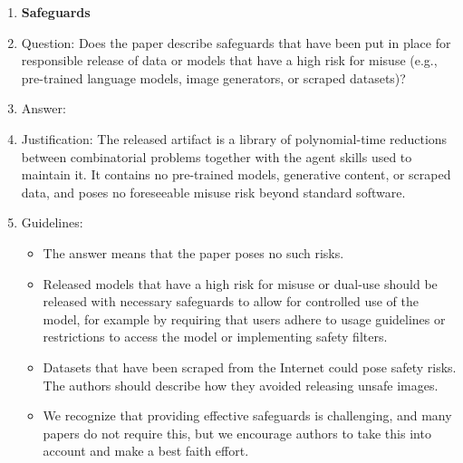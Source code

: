\begin{enumerate}
\item {\bf Safeguards}
    \item[] Question: Does the paper describe safeguards that have been put in place for responsible release of data or models that have a high risk for misuse (e.g., pre-trained language models, image generators, or scraped datasets)?
    \item[] Answer: \answerNA{}
    \item[] Justification: The released artifact is a library of polynomial-time reductions between combinatorial problems together with the agent skills used to maintain it. It contains no pre-trained models, generative content, or scraped data, and poses no foreseeable misuse risk beyond standard software.
    \item[] Guidelines:
    \begin{itemize}
        \item The answer \answerNA{} means that the paper poses no such risks.
        \item Released models that have a high risk for misuse or dual-use should be released with necessary safeguards to allow for controlled use of the model, for example by requiring that users adhere to usage guidelines or restrictions to access the model or implementing safety filters.
        \item Datasets that have been scraped from the Internet could pose safety risks. The authors should describe how they avoided releasing unsafe images.
        \item We recognize that providing effective safeguards is challenging, and many papers do not require this, but we encourage authors to take this into account and make a best faith effort.
    \end{itemize}


\end{enumerate}
